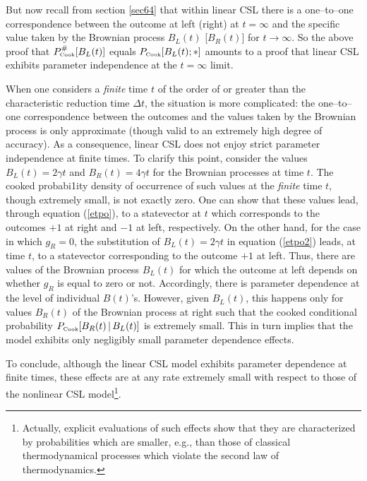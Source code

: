 \documentclass[10pt,a4paper]{article}
\begin{document}
But now recall from section \ref{sec64} that within linear CSL
there is a one--to--one correspondence between the outcome at left
(right) at $t = \infty$ and the specific value taken by the
Brownian process $B_{L}(t)$ [$B_{R}(t)$] for $t \rightarrow
\infty$. So the above proof that $P^{\#}_{\makebox{\tiny
Cook}}[B_{L}(t)]$ equals $P_{\makebox{\tiny Cook}}[B_{L}(t);*]$
amounts to a proof that linear CSL exhibits parameter independence
at the $t = \infty$ limit.

When one considers a {\it finite} time $t$ of the order of or
greater than the characteristic reduction time $\Delta t$, the
situation is more complicated: the one--to--one correspondence
between the outcomes and the values taken by the Brownian process
is only approximate (though valid to an extremely high degree of
accuracy). As a consequence, linear CSL does not enjoy strict
parameter independence at finite times. To clarify this point,
consider the values $B_{L}(t) = 2\gamma t$ and $B_{R}(t) = 4\gamma
t$ for the Brownian processes at time $t$. The cooked probabi1ity
density of occurrence of such values at the {\it finite} time $t$,
though extremely small, is not exactly zero. One can show
\cite{ngbf} that these values lead, through equation (\ref{etpo}),
to a statevector at $t$ which corresponds to the outcomes $+1$ at
right and $-1$ at left, respectively. On the other hand, for the
case in which $g_{R} = 0$, the substitution of $B_{L}(t) = 2
\gamma t$ in equation (\ref{etpo2}) leads, at time $t$, to a
statevector corresponding to the outcome $+1$ at left. Thus, there
are values of the Brownian process $B_{L}(t)$ for which the
outcome at left depends on whether $g_{R}$ is equal to zero or
not. Accordingly, there is parameter dependence at the level of
individual $B(t)$'s. However, given $B_{L}(t)$, this happens only
for values $B_{R}(t)$ of the Brownian process at right such that
the cooked conditional probability $P_{\makebox{\tiny
Cook}}[B_{R}(t)\,|\,B_{L}(t)]$ is extremely small. This in turn
implies that the model exhibits only negligibly small parameter
dependence effects.

To conclude, although the linear CSL model exhibits parameter
dependence at finite times, these effects are at any rate
extremely small with respect to those of the nonlinear CSL
model\footnote{Actually, explicit evaluations of such effects show
that they are characterized by probabilities which are smaller,
e.g., than those of classical thermodynamical processes which
violate the second law of thermodynamics.}.
\end{document}
